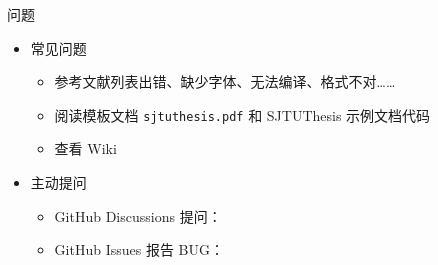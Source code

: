 \begin{frame}[fragile]{\SJTUThesis 问题}
  \begin{itemize}
    \item 常见问题
          \begin{itemize}
            \item 参考文献列表出错、缺少字体、无法编译、格式不对……
            \item 阅读模板文档 \verb|sjtuthesis.pdf| 和 SJTUThesis 示例文档代码
            \item 查看 Wiki 
          \end{itemize}

    \item 主动提问
          \begin{itemize}
            \item GitHub Discussions 提问：
            \item GitHub Issues 报告 BUG：
          \end{itemize}

  \end{itemize}
\end{frame}
